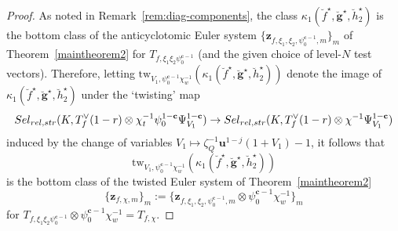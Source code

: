 \documentclass[10pt,letterpaper]{amsart}
\theoremstyle{plain}
\theoremstyle{definition}
\theoremstyle{definition}
\theoremstyle{plain}
\theoremstyle{plain}
\theoremstyle{plain}
\theoremstyle{remark}
\numberwithin{equation}{section}
\newcommand{\cc}{\mathbf{c}}
\newcommand{\Sel}{Sel}
\newcommand{\pp}{\mathfrak{p}}
\newcommand{\relstr}{{{\rm rel},{\rm str}}}
\def\Sel{{\rm Sel}}
\newcommand{\bfg}{{\boldsymbol{g}}}
\newcommand{\bfh}{{\boldsymbol{h}}}
\begin{document}
\begin{proof}

As %
noted in Remark~\ref{rem:diag-components}, the class $\kappa_1(\breve{f}^\star,\breve{\bfg}^\star,\breve{h}_2^\star)$ is the bottom class of the anticyclotomic Euler system $\{\mathbf{z}_{f,\xi_1,\xi_2,\psi_0^{\cc-1},m}\}_m$ of Theorem~\ref{maintheorem2} for $T_{f,\xi_1\xi_2\psi_0^{\cc-1}}$ (and the given choice of level-$N$ test vectors). Therefore, letting ${\mathrm{tw}}_{V_1,\psi_0^{\cc-1}\chi_w^{-1}}(\kappa_1(\breve{f}^\star,\breve{\bfg}^\star,\breve{h}_2^\star))$ denote the image of $\kappa_1(\breve{f}^\star,\breve{\bfg}^\star,\breve{h}^\star_2)$ under the `twisting' map
\[
\Sel_{\relstr}(K,T_f^{\vee}(1-r)\otimes\chi_t^{-1}\psi_0^{1-\cc}\Psi_{V_1}^{1-\cc})\rightarrow\Sel_{\relstr}(K,T_f^{\vee}(1-r)\otimes\chi^{-1}\Psi_{V_1}^{1-\cc})
\]
induced by the change of variables $V_1\mapsto\zeta_Q^{-1}\mathbf{u}^{1-j}(1+V_1)-1$, it follows that \[{\mathrm{tw}}_{V_1,\psi_0^{\cc-1}\chi_w^{-1}}(\kappa_1(\breve{f}^\star,\breve{\bfg}^\star,\breve{h}_2^\star))\] is the bottom class of the twisted Euler system of Theorem~\ref{maintheorem2}
\begin{equation}\label{eq:tw-ES-def}
\bigl\{\mathbf{z}_{f,\chi,m}\bigr\}_m:=\bigl\{\mathbf{z}_{f,\xi_1,\xi_2,\psi_0^{\cc-1},m}\otimes\psi_0^{\cc-1}\chi_w^{-1}\bigr\}_m
\end{equation}
for $T_{f,\xi_1\xi_2\psi_0^{\cc-1}}\otimes\psi_0^{\cc-1}\chi_w^{-1}=T_{f,\chi}$. 


\end{proof}
\end{document}
